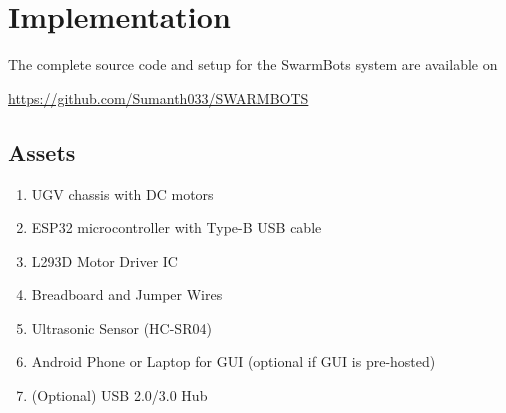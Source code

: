\documentclass[conference]{IEEEtran}
\begin{document}
\section{Implementation}
\label{sec:Implementation}

The complete source code and setup for the SwarmBots system are available on 
\begin{center}
  \url{https://github.com/Sumanth033/SWARMBOTS}
\end{center}

\subsection{Assets}
\begin{enumerate}
    \item UGV chassis with DC motors
    \item ESP32 microcontroller with Type-B USB cable
    \item L293D Motor Driver IC
    \item Breadboard and Jumper Wires
    \item Ultrasonic Sensor (HC-SR04)
    \item Android Phone or Laptop for GUI (optional if GUI is pre-hosted)
    \item (Optional) USB 2.0/3.0 Hub
\end{enumerate}
\end{document}
